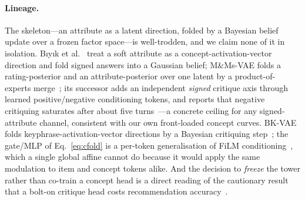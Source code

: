 \documentclass[11pt]{article}
\begin{document}
\paragraph{Lineage.} The skeleton---an attribute as a latent direction, folded by a Bayesian belief update over a
frozen factor space---is well-trodden, and we claim none of it in isolation. B\i y\i k et al.~\cite{biyik2023soft} treat a
soft attribute as a concept-activation-vector direction and fold signed answers into a Gaussian belief; M\&Ms-VAE
folds a rating-posterior and an attribute-posterior over one latent by a product-of-experts
merge~\cite{antognini2021mmvae}; its successor adds an independent \emph{signed} critique axis through learned
positive/negative conditioning tokens, and reports that negative critiquing saturates after about five
turns~\cite{antognini2022posneg}---a concrete ceiling for any signed-attribute channel, consistent with our own
front-loaded concept curves. BK-VAE folds keyphrase-activation-vector directions by a Bayesian critiquing
step~\cite{yang2021bkvae}; the gate/MLP of Eq.~\eqref{eq:cfold} is a per-token generalisation of FiLM
conditioning~\cite{perez2018film}, which a single global affine cannot do because it would apply the same modulation to
item and concept tokens alike. And the decision to \emph{freeze} the tower rather than co-train a concept head is a
direct reading of the cautionary result that a bolt-on critique head costs recommendation
accuracy~\cite{wu2019dlc,luo2020cevae}.
\end{document}
